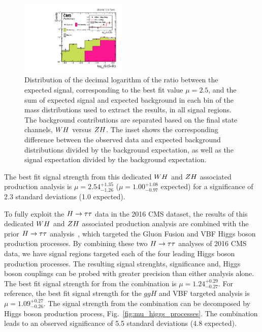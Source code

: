 \begin{figure}[!ht]
 \begin{center}
  \includegraphics[width=0.45\textwidth]{higgs_to_taus_vh/plots/combined/wh_vs_zh_sbweight.pdf}
 \end{center}
 \caption{
 Distribution of the decimal logarithm of the ratio between the expected signal, 
 corresponding to the best fit value $\mu=2.5$, and the 
 sum of expected signal and expected background in each bin of the mass distributions 
 used to extract the results, in all signal regions. The background contributions are 
 separated based on the final state channels, $WH$ versus $ZH$. The inset 
 shows the corresponding difference between the 
 observed data and expected background distributions divided by the background expectation, 
 as well as the signal expectation divided by the background expectation.
 }
 \label{fig:sb}
\end{figure}



The best fit signal
strength from this dedicated $WH$ and $ZH$ associated production analysis is 
$\mu = 2.54 ^{+1.35} _{-1.26}$ ($\mu = 1.00 ^{+1.08} _{-0.97}$ expected) 
for a significance of 2.3 standard deviations (1.0 expected).

To fully exploit the $H \to \tau\tau$ data in the 2016 CMS dataset, the results
of this dedicated $WH$ and $ZH$ associated production analysis are combined with the prior
$H \to \tau\tau$ analysis~\cite{HIG-16-043}, which targeted the Gluon Fusion and
VBF Higgs boson production processes. 
By combining these two $H\to\tau\tau$ analyses of
2016 CMS data, we have signal regions targeted each of the four leading Higgs 
boson production processes. The resulting signal strenghts, significance and, Higgs
boson couplings can be probed with greater precision than either analysis alone.
The best fit signal strength for from the combination is $\mu = 1.24 ^{+0.29} _{-0.27}$.
For reference, the best fit signal strength for the $ggH$ and VBF targeted analysis
is $\mu = 1.09 ^{+0.27} _{-0.26}$.
The signal strength from the combination can be decomposed by Higgs boson production 
process, Fig.~\ref{fig:mu_higgs_processes}. The combination leads to an 
observed significance of 5.5 standard deviations (4.8 expected). 

